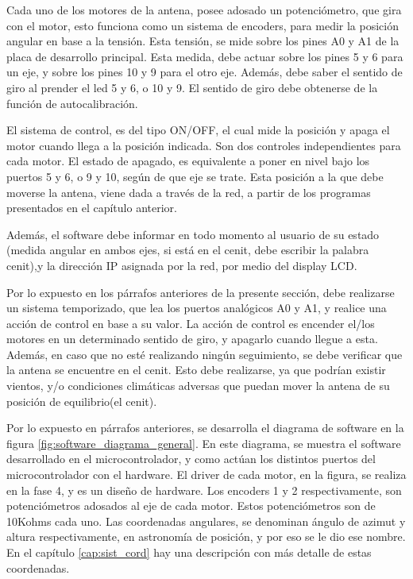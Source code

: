 Cada uno de los motores de la antena, posee adosado un potenciómetro, que gira con el motor, esto funciona como un sistema de encoders, para medir la posición angular en base a la tensión. Esta tensión, se mide sobre los pines A0 y A1 de la placa de desarrollo principal. Esta medida, debe actuar sobre los pines 5 y 6 para un eje, y sobre los pines 10 y 9 para el otro eje. Además, debe saber el sentido de giro al prender el led 5 y 6, o 10 y 9. El sentido de giro debe obtenerse de la función de autocalibración.  

El sistema de control, es del tipo ON/OFF, el cual mide la posición y apaga el motor cuando llega a la posición indicada. Son dos controles independientes para cada motor. El estado de apagado, es equivalente a poner en nivel bajo los puertos 5 y 6, o 9 y 10, según  de que eje se trate. Esta posición a la que debe moverse la antena, viene dada a través de la red, a partir de los programas presentados en el capítulo anterior. 

Además, el software debe informar en todo momento al usuario de su estado (medida angular en ambos ejes, si está en el cenit, debe escribir la palabra cenit),y la dirección IP asignada por la red, por medio del display LCD.  

Por lo expuesto en los párrafos anteriores de la presente sección, debe realizarse un sistema temporizado, que lea los puertos analógicos A0 y A1, y realice una acción de control en base a su valor. La acción de control es encender el/los motores en un determinado sentido de giro, y apagarlo cuando llegue a esta. Además, en caso que no esté realizando ningún seguimiento, se debe verificar que la antena se encuentre en el cenit. Esto debe realizarse, ya que podrían existir vientos, y/o condiciones climáticas adversas que puedan mover la antena de su posición de equilibrio(el cenit). 


Por lo expuesto en párrafos anteriores, se desarrolla el diagrama de software en la figura  \ref{fig:software_diagrama_general}. En este diagrama, se muestra el software desarrollado en el microcontrolador, y como actúan los distintos puertos del microcontrolador con el hardware. El driver de cada motor, en la figura, se realiza en la fase 4, y es un diseño de hardware. Los encoders 1 y 2 respectivamente, son potenciómetros adosados al eje de cada motor. Estos potenciómetros son de 10Kohms cada uno. Las coordenadas angulares, se denominan ángulo de azimut y altura respectivamente, en astronomía de posición, y por eso se le dio ese nombre. En el capítulo \ref{cap:sist_cord} hay una descripción con más detalle de estas coordenadas. 

